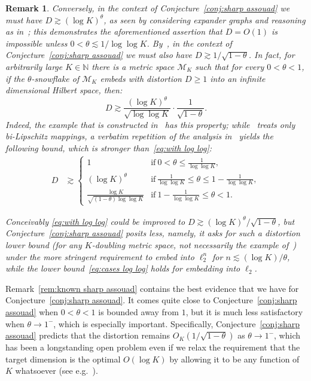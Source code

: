 \documentclass[11pt,reqno]{amsart}
\newtheorem{remark}[theorem]{Remark}
\newcommand{\N}{\mathbb{N}}
\renewcommand{\le}{\leqslant}
\renewcommand{\ge}{\geqslant}
\newcommand{\MM}{\mathcal{M}}
\newcommand{\1}{\mathbf{1}}
\begin{document}
\begin{remark}
{Conversely, in the context of Conjecture~\ref{conj:sharp assouad} we must have $D\gtrsim (\log K)^\theta$, as seen by considering expander graphs and reasoning as in~\cite{LLR95}; this demonstrates  the aforementioned assertion that $D=O(1)$ is impossible unless $0<\theta\lesssim 1/\log\log K$. By~\cite{LMN}, in the context of Conjecture~\ref{conj:sharp assouad}  we must also have $D\gtrsim 1/\sqrt{1-\theta}$. In fact, for arbitrarily large  $K\in \N$ there is a metric space $\MM_K$ such that for every $0<\theta<1$, if the $\theta$-snowflake of $\MM_K$ embeds with distortion $D\ge 1$ into an infinite dimensional Hilbert space, then: 
\begin{equation}\label{eq:with log log}
D\gtrsim \frac{(\log K)^\theta}{\sqrt{\log \log K}}\cdot \frac{1}{\sqrt{1-\theta}}.
\end{equation}
Indeed, the example that is constructed in~\cite{JLM09} has this property; while~\cite{JLM09} treats only bi-Lipschitz mappings, a verbatim repetition of the analysis in~\cite{JLM09} yields the following bound, which is stronger than~\eqref{eq:with log log}:
\begin{align}\label{eq:cases log log}
D&\gtrsim \left\{\begin{array}{ll}1&\mathrm{if\ } 0<\theta\le \frac{1}{\log \log K},\\
(\log K)^\theta &\mathrm{if\ } \frac{1}{\log \log K}\le \theta\le 1-\frac{1}{\log \log K},\\
\frac{\log K}{\sqrt{(1-\theta)\log \log K}}&\mathrm{if\ } 1-\frac{1}{\log \log K}\le \theta <1.\end{array}\right.
\end{align}

Conceivably \eqref{eq:with log log}  could be improved to $D\gtrsim (\log K)^\theta/\sqrt{1-\theta}$, but Conjecture~\ref{conj:sharp assouad} posits less, namely, it asks for such a distortion lower bound (for any $K$-doubling metric space, not necessarily the example of~\cite{JLM09}) under the more stringent requirement to embed into $\ell_2^n$ for $n\lesssim (\log K)/\theta$, while the lower bound~\eqref{eq:cases log log} holds for embedding into $\ell_2$.   
}
\end{remark}


Remark~\ref{rem:known sharp assouad} contains  the best evidence that we  have for Conjecture~\eqref{conj:sharp assouad}. It comes quite close to Conjecture~\eqref{conj:sharp assouad} when $0<\theta<1$ is bounded away from $1$,  but it is much less satisfactory when $\theta\to 1^-$, which is especially important. Specifically, Conjecture~\eqref{conj:sharp assouad} predicts that the distortion remains $O_K(1/\sqrt{1-\theta})$ as $\theta\to 1^-$, which  has been a longstanding open problem even if we relax the requirement that the target dimension is the optimal $O(\log K)$ by allowing it to be any function of $K$ whatsoever (see e.g.~\cite{Tao21,Ryo22,Ryo23}). 





%


\end{document}
